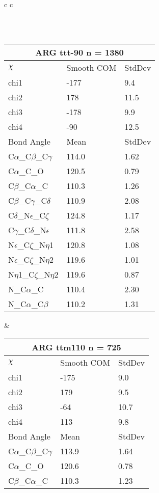 \begin{longtable}{ c c }
\begin{tabular}{ l l l }
  \end{tabular}
  \\
  \begin{tabular}{ l l l }
  \toprule
  \multicolumn{3}{c}{ARG \textbf{ttt-90} n = 1380} \\ \toprule
  $\chi$       & Smooth COM & StdDev \\ \midrule
  chi1 & -177 & 9.4 \\ 
  chi2 & 178 & 11.5 \\ 
  chi3 & -178 & 9.9 \\ 
  chi4 & -90 & 12.5 \\ \midrule
  Bond Angle   & Mean     & StdDev \\ \midrule
  C$\alpha$\_C$\beta$\_C$\gamma$ & 114.0 & 1.62\\
  C$\alpha$\_C\_O & 120.5 & 0.79\\
  C$\beta$\_C$\alpha$\_C & 110.3 & 1.26\\
  C$\beta$\_C$\gamma$\_C$\delta$ & 110.9 & 2.08\\
  C$\delta$\_N$\epsilon$\_C$\zeta$ & 124.8 & 1.17\\
  C$\gamma$\_C$\delta$\_N$\epsilon$ & 111.8 & 2.58\\
  N$\epsilon$\_C$\zeta$\_N$\eta$1 & 120.8 & 1.08\\
  N$\epsilon$\_C$\zeta$\_N$\eta$2 & 119.6 & 1.01\\
  N$\eta$1\_C$\zeta$\_N$\eta$2 & 119.6 & 0.87\\
  N\_C$\alpha$\_C & 110.4 & 2.30\\
  N\_C$\alpha$\_C$\beta$ & 110.2 & 1.31\\
  \bottomrule
  \end{tabular}
  &
  \begin{tabular}{ l l l }
  \toprule
  \multicolumn{3}{c}{ARG \textbf{ttm110} n = 725} \\ \toprule
  $\chi$       & Smooth COM & StdDev \\ \midrule
  chi1 & -175 & 9.0 \\ 
  chi2 & 179 & 9.5 \\ 
  chi3 & -64 & 10.7 \\ 
  chi4 & 113 & 9.8 \\ \midrule
  Bond Angle   & Mean     & StdDev \\ \midrule
  C$\alpha$\_C$\beta$\_C$\gamma$ & 113.9 & 1.64\\
  C$\alpha$\_C\_O & 120.6 & 0.78\\
  C$\beta$\_C$\alpha$\_C & 110.3 & 1.23\\

\end{tabular}
\end{longtable}
